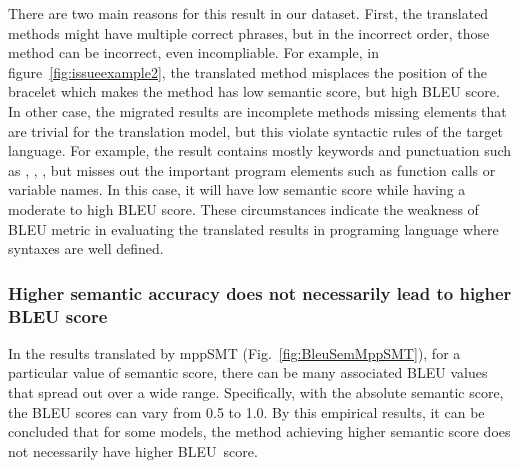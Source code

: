 There are two main reasons for this result in our dataset.
First, the translated methods might have multiple correct phrases, but in the 
incorrect order, those method can be incorrect, even incompliable.
%
For example, in figure~\ref{fig:issueexample2}, the translated method
misplaces the position of the bracelet which makes the method has low
semantic score, but high BLEU score. 
%
In other case, the migrated results are incomplete methods missing elements
that are trivial for the translation model, but this violate syntactic rules 
of the target language. For example, the result contains mostly keywords and
punctuation such as , , \code{()}, but misses
out the important program elements such as function calls or variable
names. In this case, it will have low semantic score while having
a moderate to high BLEU score. These circumstances indicate the weakness of BLEU metric 
in evaluating the translated results in programing language where syntaxes are well defined.


\subsubsection{Higher semantic accuracy does not necessarily lead to
higher BLEU score} In the results translated by mppSMT
(Fig.~\ref{fig:BleuSemMppSMT}), for a particular value of semantic
score, there can be many associated BLEU values that spread out over a
wide range. Specifically, with the absolute semantic score, the BLEU
scores can vary from 0.5 to 1.0. By this empirical results, it
can be concluded that for some models, the method achieving higher
semantic score does not necessarily have higher BLEU~score.

